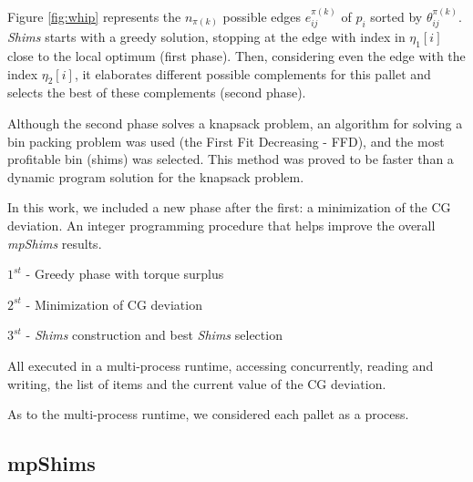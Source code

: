 \documentclass[preprint,authoryear]{elsarticle}
\begin{document}
\begin{table}[H]
\begin{minipage}{0.58\linewidth}
		\label{fig:whip}		
	\end{minipage}
\end{table}

{\color{blue}
Figure \ref{fig:whip} represents the $n_{\pi(k)}$\/ possible edges $e_{ij}^{\pi(k)}$\/ of $p_i$\/ sorted by $\theta_{ij}^{\pi(k)}$. \emph{Shims}\/ starts with a greedy solution, stopping at the edge with index in $\eta_1[i]$ close to the local optimum (first phase). Then, considering even the edge with the index $\eta_2[i]$, it elaborates different possible complements for this pallet and selects the best of these complements (second phase).

Although the second phase solves a knapsack problem, an algorithm for solving a bin packing problem was used (the First Fit Decreasing - FFD), and the most profitable bin (shims) was selected. This method was proved to be faster than a dynamic program solution for the knapsack problem.
		
	In this work, we included a new phase after the first: a minimization of the CG deviation. An integer programming procedure that helps improve the overall {\it mpShims} results.

$1^{st}$ - Greedy phase with torque surplus

$2^{st}$ - Minimization of CG deviation

$3^{st}$ - {\it Shims} construction and best {\it Shims} selection

All executed in a multi-process runtime, accessing concurrently, reading and writing, the list of items and the current value of the CG deviation.

As to the multi-process runtime, we considered each pallet as a process.
}


\subsection{mpShims}
\end{document}

